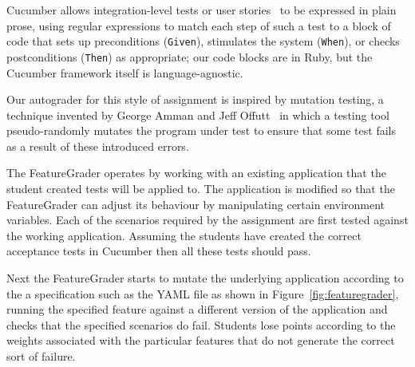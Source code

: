  Cucumber allows
integration-level tests or user stories~\cite{user-stories} to be
expressed in plain prose, using regular expressions to match each step
of such a test to a block of code that sets up preconditions (\texttt{Given}), stimulates
the system (\texttt{When}), or checks postconditions (\texttt{Then}) as
appropriate; our code blocks are in Ruby, but the Cucumber framework
itself is language-agnostic.  


Our autograder for this
style of assignment is inspired by mutation testing, a technique invented
by George Amman and Jeff 
Offutt~\cite{ammann-offutt-sw-testing} in which a
testing tool pseudo-randomly mutates the program under test to ensure
that some test fails as a result of these introduced errors.


The FeatureGrader operates by working with an existing application that the student 
created tests will be applied to.   The application is modified so that the FeatureGrader
can adjust its behaviour by manipulating certain environment variables. Each of the scenarios 
required by the assignment are first tested against the working application.  Assuming the 
students have created the correct acceptance tests in Cucumber then all these tests should pass.  

Next the FeatureGrader starts to mutate the underlying application according to the a specification
such as the YAML file as shown in Figure~\ref{fig:featuregrader}, running the specified feature against
a different version of the application and checks that the specified scenarios do fail.  Students 
lose points according to the weights associated with the particular features that do not generate the correct
sort of failure.

